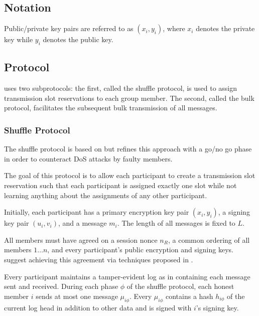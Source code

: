 \subsection{Notation}

Public/private key pairs are referred to as $(x_i, y_i)$, where $x_i$ denotes the private
key while $y_i$ denotes the public key.

\subsection{Protocol}

\Dissent uses two subprotocols: the first, called the shuffle protocol, is used to assign
transmission slot reservations to each group member. The second, called the bulk protocol,
facilitates the subsequent bulk transmission of all messages.

\subsubsection{Shuffle Protocol}

The shuffle protocol is based on \cite{brickell2006efficient} but refines this approach
with a go/no go phase in order to counteract \ac{DoS} attacks by faulty members.

The goal of this protocol is to allow each participant to create a transmission slot reservation
such that each participant is assigned exactly one slot while not learning anything about
the assignments of any other participant.

Initially, each participant has a primary encryption key pair $(x_i, y_i)$, a signing key pair
$(u_i, v_i)$, and a message $m_i$. The length of all messages is fixed to $L$.


All members must have agreed on a session nonce $n_R$, a common ordering of all members
$1 \ldots n$, and every participant's public encryption and signing keys. \citeauthor{journals/corr/abs-1004-3057} suggest achieving this agreement via techniques
proposed in \cite{lamport1998part,castro1999practical}.

Every participant maintains a tamper-evident log as in \cite{haeberlen2007peerreview}
containing each message sent and received. During each phase $\phi$ of the shuffle protocol,
each honest member $i$ sends at most one message $\mu_{i\phi}$.
Every $\mu_{i\phi}$ contains a hash $h_{i\phi}$ of the current log head in addition to other data
and is signed with $i$'s signing key.

